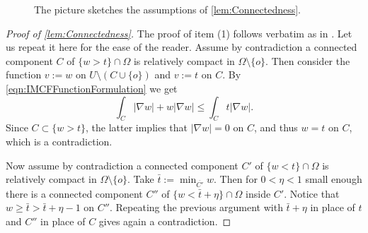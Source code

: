 \documentclass[a4paper,12pt,reqno]{amsart}
\numberwithin{equation}{section}
\theoremstyle{plain}
\theoremstyle{definition}
\theoremstyle{remark}
\begin{document}
{\begin{figure}[h]
\begin{center}
\end{center}
\caption{The picture sketches the assumptions of  \cref{lem:Connectedness}.}\label{fig:DisegnoLemmaTopologico}
\end{figure}

\begin{proof}[Proof of \cref{lem:Connectedness}]
         The proof of item (1) follows verbatim as in \cite[Connectedness Lemma 4.2(i)]{HuiskenIlmanen}. Let us repeat it here for the ease of the reader. Assume by contradiction a connected component $C$ of $\{w>t\}\cap\Omega$ is relatively compact in $\Omega\setminus\{o\}$. Then consider the function $v:=w$ on $U\setminus (C\cup\{o\})$ and $v:=t$ on $C$. By \eqref{eqn:IMCFFunctionFormulation} we get
         \[
         \int_C |\nabla w|+w|\nabla w|\leq \int_C t|\nabla w|.
         \]
         Since $C\subset \{w>t\}$, the latter implies that $|\nabla w|=0$ on $C$, and thus $w=t$ on $C$, which is a contradiction. 
         
         Now assume by contradiction a connected component $C'$ of $\{w<t\}\cap\Omega$ is relatively compact in $\Omega\setminus\{o\}$. Take $\bar t:=\min_{\overline{C'}} w$. Then for $0<\eta<1$ small enough there is a connected component $C''$ of $\{w<\bar t+\eta\}\cap\Omega$ inside $C'$. Notice that $w\geq\bar t>\bar t+\eta -1$ on $C''$. Repeating the previous argument with $\bar t+\eta$ in place of $t$ and $C''$ in place of $C$ gives again a contradiction.


\end{proof}}
\end{document}
